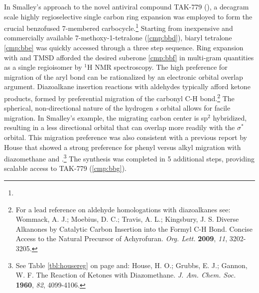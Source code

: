In Smalley's approach to the novel antiviral compound TAK-779 (), a decagram
scale highly regioselective single carbon ring expansion was employed to form the crucial benzofused
7-membered carbocycle.\footnote{} Starting from inexpensive and commercially available 7-methoxy-1-tetralone
(\ref{cmp:bbd}), biaryl tetralone \ref{cmp:bbe} was quickly accessed through a three step sequence. 
Ring expansion with  and TMSD afforded the desired suberone \ref{cmp:bbf} in multi-gram
quantities as a single regioisomer by $^1$H NMR spectroscopy. The high preference for migration of the aryl bond can be rationalized by an electronic orbital overlap
argument. Diazoalkane insertion reactions with aldehydes typically afford ketone products, formed by
preferential migration of the carbonyl C-H bond.\footnote{For a lead reference on
aldehyde homologations with diazoalkanes see: {\frenchspacing Wommack, A. J.; Moebius, D. C.;
Travis, A. L.; Kingsbury, J. S. Diverse Alkanones by Catalytic Carbon Insertion into the Formyl C-H
Bond. Concise Access to the Natural Precursor of Achyrofuran. \textit{Org. Lett.} \textbf{2009},
\textit{11}, 3202-3205.}} The spherical, non-directional nature of the hydrogen \textit{s} orbital
allows for facile migration. In Smalley's example, the migrating carbon center is sp$^2$ hybridized,
resulting in a less directional orbital that can overlap more readily with the  $\sigma^*$
orbital. This migration preference was also consistent with a previous report by House that showed a
strong preference for phenyl versus alkyl migration with diazomethane and
.\footnote{See Table \ref{tbl:housereg} on page \pageref{tbl:housereg} and:
{\frenchspacing House, H. O.; Grubbs, E. J.; Gannon, W. F. The Reaction of Ketones with
Diazomethane. \textit{J. Am. Chem. Soc.} \textbf{1960}, \textit{82}, 4099-4106.}} The synthesis was
completed in 5 additional steps, providing scalable access to TAK-779 (\ref{cmp:bbg}).
